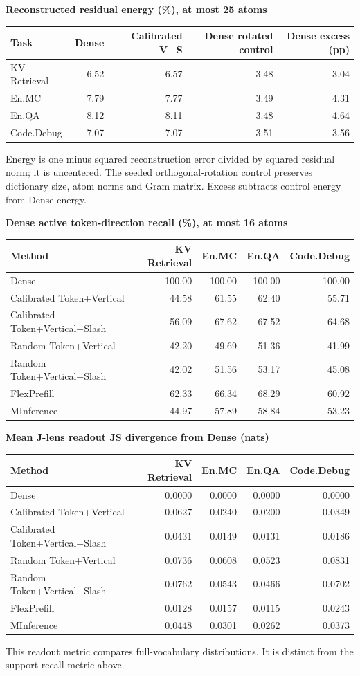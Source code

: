\documentclass[10pt]{article}
\newcommand{\taskheader}{Method & KV Retrieval & En.MC & En.QA & Code.Debug\\}
\begin{document}
\textbf{Reconstructed residual energy (\%), at most 25 atoms}
\begin{center}\begin{tabular}{lrrrr}\toprule Task & Dense & Calibrated V+S & Dense rotated control & Dense excess (pp)\\\midrule
KV Retrieval & 6.52 & 6.57 & 3.48 & 3.04 \\
En.MC & 7.79 & 7.77 & 3.49 & 4.31 \\
En.QA & 8.12 & 8.11 & 3.48 & 4.64 \\
Code.Debug & 7.07 & 7.07 & 3.51 & 3.56 \\
\bottomrule\end{tabular}\end{center}
Energy is one minus squared reconstruction error divided by squared residual norm; it is uncentered. The seeded orthogonal-rotation control preserves dictionary size, atom norms and Gram matrix. Excess subtracts control energy from Dense energy.

\clearpage
\textbf{Dense active token-direction recall (\%), at most 16 atoms}
\begin{center}\begin{tabular}{lrrrr}\toprule\taskheader\midrule
Dense & 100.00 & 100.00 & 100.00 & 100.00 \\
Calibrated Token+Vertical & 44.58 & 61.55 & 62.40 & 55.71 \\
Calibrated Token+Vertical+Slash & 56.09 & 67.62 & 67.52 & 64.68 \\
Random Token+Vertical & 42.20 & 49.69 & 51.36 & 41.99 \\
Random Token+Vertical+Slash & 42.02 & 51.56 & 53.17 & 45.08 \\
FlexPrefill & 62.33 & 66.34 & 68.29 & 60.92 \\
MInference & 44.97 & 57.89 & 58.84 & 53.23 \\
\bottomrule\end{tabular}\end{center}

\textbf{Mean J-lens readout JS divergence from Dense (nats)}
\begin{center}\begin{tabular}{lrrrr}\toprule\taskheader\midrule
Dense & 0.0000 & 0.0000 & 0.0000 & 0.0000 \\
Calibrated Token+Vertical & 0.0627 & 0.0240 & 0.0200 & 0.0349 \\
Calibrated Token+Vertical+Slash & 0.0431 & 0.0149 & 0.0131 & 0.0186 \\
Random Token+Vertical & 0.0736 & 0.0608 & 0.0523 & 0.0831 \\
Random Token+Vertical+Slash & 0.0762 & 0.0543 & 0.0466 & 0.0702 \\
FlexPrefill & 0.0128 & 0.0157 & 0.0115 & 0.0243 \\
MInference & 0.0448 & 0.0301 & 0.0262 & 0.0373 \\
\bottomrule\end{tabular}\end{center}
This readout metric compares full-vocabulary distributions. It is distinct from the support-recall metric above.
\end{document}
